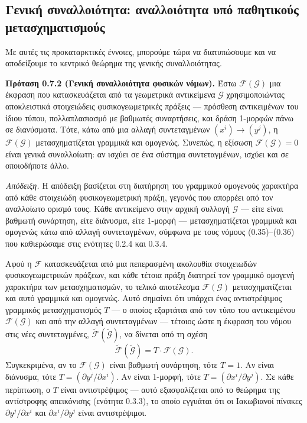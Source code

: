 \documentclass[12pt]{article}
\begin{document}
\subsection{Γενική συναλλοιότητα: αναλλοιότητα υπό παθητικούς μετασχηματισμούς}

Με αυτές τις προκαταρκτικές έννοιες, μπορούμε τώρα να διατυπώσουμε και να αποδείξουμε το κεντρικό θεώρημα της γενικής συναλλοιότητας.

\textbf{Πρόταση 0.7.2 (Γενική συναλλοιότητα φυσικών νόμων).}
Έστω $\mathcal{F}(\mathcal{G})$ μια έκφραση που κατασκευάζεται από τα γεωμετρικά αντικείμενα $\mathcal{G}$ χρησιμοποιώντας αποκλειστικά στοιχειώδεις φυσικογεωμετρικές πράξεις — πρόσθεση αντικειμένων του ίδιου τύπου, πολλαπλασιασμό με βαθμωτές συναρτήσεις, και δράση 1-μορφών πάνω σε διανύσματα. Τότε, κάτω από μια αλλαγή συντεταγμένων $(x^i) \to (y^j)$, η $\mathcal{F}(\mathcal{G})$ μετασχηματίζεται γραμμικά και ομογενώς. Συνεπώς, η εξίσωση $\mathcal{F}(\mathcal{G}) = 0$ είναι γενικά συναλλοίωτη: αν ισχύει σε ένα σύστημα συντεταγμένων, ισχύει και σε οποιοδήποτε άλλο.

\textit{Απόδειξη.} Η απόδειξη βασίζεται στη διατήρηση του γραμμικού ομογενούς χαρακτήρα από κάθε στοιχειώδη φυσικογεωμετρική πράξη, γεγονός που απορρέει από τον αναλλοίωτο ορισμό τους. Κάθε αντικείμενο στην αρχική συλλογή $\mathcal{G}$ — είτε είναι βαθμωτή συνάρτηση, είτε διάνυσμα, είτε 1-μορφή — μετασχηματίζεται γραμμικά και ομογενώς κάτω από αλλαγή συντεταγμένων, σύμφωνα με τους νόμους (0.35)–(0.36) που καθιερώσαμε στις ενότητες 0.2.4 και 0.3.4.

Αφού η $\mathcal{F}$ κατασκευάζεται από μια πεπερασμένη ακολουθία στοιχειωδών φυσικογεωμετρικών πράξεων, και κάθε τέτοια πράξη διατηρεί τον γραμμικό ομογενή χαρακτήρα των μετασχηματισμών, το τελικό αποτέλεσμα $\mathcal{F}(\mathcal{G})$ μετασχηματίζεται και αυτό γραμμικά και ομογενώς. Αυτό σημαίνει ότι υπάρχει ένας αντιστρέψιμος γραμμικός μετασχηματισμός $T$ — ο οποίος εξαρτάται από τον τύπο του αντικειμένου $\mathcal{F}(\mathcal{G})$ και από την αλλαγή συντεταγμένων — τέτοιος ώστε η έκφραση του νόμου στις νέες συντεταγμένες, $\tilde{\mathcal{F}}(\tilde{\mathcal{G}})$, να δίνεται από τη σχέση
\[
\tilde{\mathcal{F}}(\tilde{\mathcal{G}}) = T \cdot \mathcal{F}(\mathcal{G}). \tag{0.37}
\]
Συγκεκριμένα, αν το $\mathcal{F}(\mathcal{G})$ είναι βαθμωτή συνάρτηση, τότε $T = 1$. Αν είναι διάνυσμα, τότε $T = (\partial y^j / \partial x^i)$. Αν είναι 1-μορφή, τότε $T = (\partial x^i / \partial y^j)$. Σε κάθε περίπτωση, ο $T$ είναι αντιστρέψιμος — αυτό εξασφαλίζεται από το θεώρημα της αντίστροφης απεικόνισης (ενότητα 0.3.3), το οποίο εγγυάται ότι οι Ιακωβιανοί πίνακες $\partial y^j / \partial x^i$ και $\partial x^i / \partial y^j$ είναι αντιστρέψιμοι.
\end{document}
